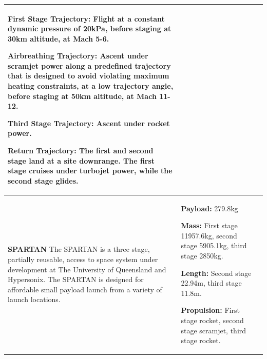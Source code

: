 {\begin{landscape}
\begin{xltabular}{\linewidth}{|X|X|X|}
	\textbf{First Stage Trajectory:} Flight at a constant dynamic pressure of 20kPa, before staging at 30km altitude, at Mach 5-6.
	
	\textbf{Airbreathing Trajectory:} Ascent under scramjet power along a predefined trajectory that is designed to avoid violating maximum heating constraints, at a low trajectory angle, before staging at 50km altitude, at Mach 11-12.
	
	\textbf{Third Stage Trajectory:} Ascent under rocket power. 
	
	\textbf{Return Trajectory:} The first and second stage land at a site downrange. The first stage cruises under turbojet power, while the second stage glides. 
	

	\\
	\hline \small
	\textbf{SPARTAN}\cite{Preller2018a} \newline\newline
	The SPARTAN is a three stage, partially reusable, access to space system under development at The University of Queensland\cite{Jazra2013,Preller2018a} and Hypersonix\cite{Hypersonix}. The SPARTAN is designed for affordable small payload launch from a variety of launch locations. 
	&\small
	
	\textbf{Payload:} 279.8kg
	
	\textbf{Mass:} First stage 11957.6kg, second stage 5905.1kg, third stage 2850kg.
	
	\textbf{Length:} Second stage 22.94m, third stage 11.8m. 
	
	\textbf{Propulsion:} First stage rocket, second stage scramjet, third stage rocket.
	
	
	&\small
	

\end{xltabular}
\end{landscape}}
